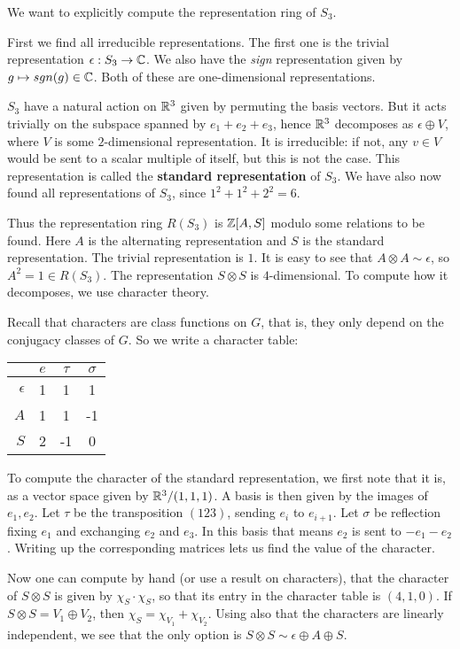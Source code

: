 \documentclass[11pt, english]{article}
\begin{document}
We want to explicitly compute the representation ring of $S_3$.

First we find all irreducible representations. The first one is the trivial representation $\epsilon:S_3 \to \mathbb{C}$. We also have the \emph{sign} representation given by $g \mapsto  sgn(g) \in \mathbb{C} $. Both of these are one-dimensional representations.

$S_3$ have a natural action on $\mathbb{R}^3$ given by permuting the basis vectors. But it acts trivially on the subspace spanned by $e_1+e_2+e_3$, hence $\mathbb{R}^3$ decomposes as $\epsilon \oplus V$, where $V$ is some $2$-dimensional representation. It is irreducible: if not, any $v \in V$ would be sent to a scalar multiple of itself, but this is not the case. This representation is called the \textbf{standard representation} of $S_3$. We have also now found all representations of $S_3$, since $1^2+1^2+2^2=6$. 

Thus the representation ring $R(S_3)$ is $\mathbb{Z}[A,S]$ modulo some relations to be found. Here $A$ is the alternating representation and $S$ is the standard representation. The trivial representation is $1$. It is easy to see that $A \otimes A \sim \epsilon$, so $A^2=1 \in R(S_3)$. The representation $S \otimes S$ is $4$-dimensional. To compute how it decomposes, we use character theory.

Recall that characters are class functions on $G$, that is, they only depend on the conjugacy classes of $G$. So we write a character table:

\begin{center}
\begin{tabular}{ r | c c  c }
 & $e$ & $\tau$ & $\sigma$ \\
\hline
$\epsilon$ & 1 & 1 & 1  \\
$A$ & 1 & 1 & -1 \\
$S$ & 2 & -1 & 0 \\
\end{tabular}
\end{center}

To compute the character of the standard representation, we first note that it is, as a vector space given by $\mathbb{R}^3/(1,1,1)$. A basis is then given by the images of $e_1,e_2$. Let $\tau$ be the transposition $(123)$, sending $e_i$ to $e_{i+1}$. Let $\sigma$ be reflection fixing $e_1$ and exchanging $e_2$ and $e_3$. In this basis that means $e_2$ is sent to $-e_1-e_2$. Writing up the corresponding matrices lets us find the value of the character.

Now one can compute by hand (or use a result on characters), that the character of $S \otimes S$ is given by $\chi_S \cdot \chi_S$, so that its entry in the character table is $(4,1,0)$. If $S \otimes S = V_1 \oplus V_2$, then $\chi_S = \chi_{V_1} + \chi_{V_2}$. Using also that the characters are linearly independent, we see that the only option is $S \otimes S \sim \epsilon \oplus A \oplus S$.
\end{document}
